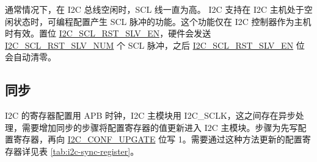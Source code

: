 \documentclass[main\_\_CN.tex]{subfiles}
\begin{document}
通常情况下，在 I2C 总线空闲时，SCL 线一直为高。\chipname{} I2C 支持在 I2C 主机处于空闲状态时，可编程配置产生 SCL 脉冲的功能。这个功能仅在 I2C 控制器作为主机时有效。置位 \hyperref[fielddesc:I2CSCLRSTSLVEN]{I2C\_SCL\_RST\_SLV\_EN}，硬件会发送 \hyperref[fielddesc:I2CSCLRSTSLVNUM]{I2C\_SCL\_RST\_SLV\_NUM} 个 SCL 脉冲，之后 \hyperref[fielddesc:I2CSCLRSTSLVEN]{I2C\_SCL\_RST\_SLV\_EN} 位会自动清零。

\subsection{同步}

I2C 的寄存器配置用 APB 时钟，I2C 主模块用 I2C\_SCLK，这之间存在异步处理，需要增加同步的步骤将配置寄存器的值更新进入 I2C 主模块。步骤为先写配置寄存器，再向 \hyperref[fielddesc:I2CCONFUPGATE]{I2C\_CONF\_UPGATE} 位写 1。需要通过这种方法更新的配置寄存器详见表 \ref{tab:i2c-sync-register}。
\end{document}
